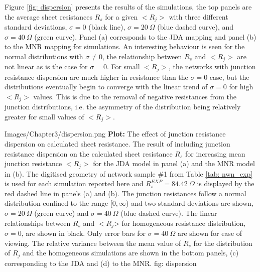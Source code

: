 Figure \ref{fig: dispersion} presents the results of the simulations, the top panels are the average sheet resistances $R_s$ for a given $<R_j>$ with three different standard deviations, $\sigma = 0$ (black line), $\sigma = 20~\Omega$ (blue dashed curve), and $\sigma = 40 ~ \Omega$ (green curve). Panel (a) corresponds to the JDA mapping and panel (b) to the MNR mapping for simulations. An interesting behaviour is seen for the normal distributions with $\sigma \neq 0$, the relationship between $R_s$ and $<R_j>$ are not linear as is the case for $\sigma = 0$. For small $<R_j>$, the networks with junction resistance dispersion are much higher in resistance than the $\sigma = 0$ case, but the distributions eventually begin to converge with the linear trend of $\sigma = 0$ for high $<R_j>$ values. This is due to the removal of negative resistances from the junction distributions, i.e. the asymmetry of the distribution being relatively greater for small values of $<R_j>$. 

{Images/Chapter3/dispersion.png}
{\textbf{Plot:} The effect of junction resistance dispersion on calculated sheet resistance.}
{The result of including junction resistance dispersion on the calculated sheet resistance $R_s$ for increasing mean junction resistance $<R_j>$ for the JDA model in panel (a) and the MNR model in (b). The digitised geometry of network sample \#1 from Table \ref{tab: nwn_exp} is used for each simulation reported here and $R_s^{EXP} = 84.42~\Omega$ is displayed by the red dashed line in panels (a) and (b). The junction resistances follow a normal distribution confined to the range [$0,\infty$) and two standard deviations are shown, $\sigma = 20 ~ \Omega$ (green curve) and $\sigma = 40 ~ \Omega$ (blue dashed curve). The linear relationships between $R_s$ and $<R_j$> for homogeneous resistance distribution, $\sigma = 0$, are shown in black. Only error bars for $\sigma = 40~\Omega$ are shown for ease of viewing. The relative variance between the mean value of $R_s$ for the distribution of $R_j$ and the homogeneous simulations are shown in the bottom panels, (c) corresponding to the JDA and (d) to the MNR\cite{rocha2015}.}
{fig: dispersion}

